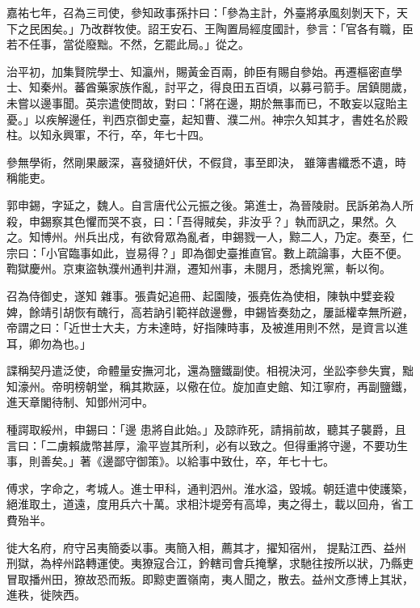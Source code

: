 \begin{pinyinscope}
 嘉祐七年，召為三司使，參知政事孫抃曰：「參為主計，外臺將承風刻剝天下，天下之民困矣。」乃改群牧使。詔王安石、王陶置局經度國計，參言：「官各有職，臣
 若不任事，當從廢黜。不然，乞罷此局。」從之。



 治平初，加集賢院學士、知瀛州，賜黃金百兩，帥臣有賜自參始。再遷樞密直學士、知秦州。蕃酋藥家族作亂，討平之，得良田五百頃，以募弓箭手。居鎮閱歲，未嘗以邊事聞。英宗遣使問故，對曰：「將在邊，期於無事而已，不敢妄以寇貽主憂。」以疾解邊任，判西京御史臺，起知曹、濮二州。神宗久知其才，書姓名於殿柱。以知永興軍，不行，卒，年七十四。



 參無學術，然剛果嚴深，喜發擿奸伏，不假貸，事至即決，
 雖簿書纖悉不遺，時稱能吏。



 郭申錫，字延之，魏人。自言唐代公元振之後。第進士，為晉陵尉。民訴弟為人所殺，申錫察其色懼而哭不哀，曰：「吾得賊矣，非汝乎？」執而訊之，果然。久之。知博州。州兵出戍，有欲脅眾為亂者，申錫戮一人，黥二人，乃定。奏至，仁宗曰：「小官臨事如此，豈易得？」即為御史臺推直官。數上疏論事，大臣不便。鞫獄慶州。京東盜執濮州通判井淵，遷知州事，未閱月，悉擒兇黨，斬以徇。



 召為侍御史，遂知
 雜事。張貴妃追冊、起園陵，張堯佐為使相，陳執中嬖妾殺婢，餘靖引胡恢有醜行，高若訥引範祥啟邊釁，申錫皆奏劾之，屢詆權幸無所避，帝謂之曰：「近世士大夫，方未達時，好指陳時事，及被進用則不然，是資言以進耳，卿勿為也。」



 諜稱契丹遣泛使，命體量安撫河北，還為鹽鐵副使。相視決河，坐訟李參失實，黜知濠州。帝明榜朝堂，稱其欺誣，以儆在位。旋加直史館、知江寧府，再副鹽鐵，進天章閣待制、知鄧州河中。



 種諤取綏州，申錫曰：「邊
 患將自此始。」及諒祚死，請捐前故，聽其子襲爵，且言曰：「二虜賴歲幣甚厚，渝平豈其所利，必有以致之。但得重將守邊，不要功生事，則善矣。」著《邊鄙守御策》。以給事中致仕，卒，年七十七。



 傅求，字命之，考城人。進士甲科，通判泗州。淮水溢，毀城。朝廷遣中使護築，絕淮取土，道遠，度用兵六十萬。求相汴堤旁有高埠，夷之得土，載以回舟，省工費殆半。



 徙大名府，府守呂夷簡委以事。夷簡入相，薦其才，擢知宿州，
 提點江西、益州刑獄，為梓州路轉運使。夷獠寇合江，鈐轄司會兵掩擊，求馳往按所以狀，乃縣吏冒取播州田，獠故恐而叛。即黥吏置嶺南，夷人聞之，散去。益州文彥博上其狀，進秩，徙陜西。




\end{pinyinscope}
